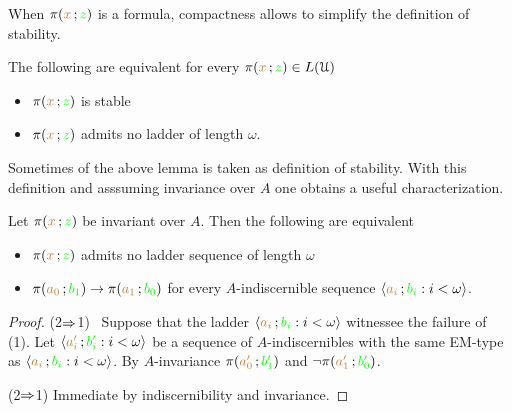 
When $\pi({\color{brown} x}\,;{\color{green} z})$ is a formula, compactness allows to simplify the definition of stability.

\begin{fact}\label{}
  The following are equivalent for every $\pi({\color{brown} x}\,;{\color{green} z})\in L(\EuScript U)$
  \begin{itemize}
    \item [1.] $\pi({\color{brown} x}\,;{\color{green} z})$ is stable
    \item [2.] $\pi({\color{brown} x}\,;{\color{green} z})$ admits no ladder of length $\omega$.
  \end{itemize}
\end{fact}

Sometimes  of the above lemma is taken as definition of stability.
With this definition and asssuming invariance over $A$ one obtains a useful characterization.

\begin{theorem}\label{thm_sability_indiscernibility}
  Let $\pi({\color{brown} x}\,;{\color{green} z})$ be invariant over $A$.
  Then the following are equivalent
  \begin{itemize}
    \item[1.] $\pi({\color{brown} x}\,;{\color{green} z})$ admits no ladder sequence of length $\omega$
    \item[2.] $\pi({\color{brown} a_0}\,;{\color{green} b_1})\rightarrow\pi({\color{brown} a_1}\,;{\color{green} b_0})$ for every $A$-indiscernible sequence $\langle{\color{brown}a_i}\,;{\color{green} b_i} : i<\omega\rangle$.
  \end{itemize}
\end{theorem}

\begin{proof}
  (2$\Rightarrow$1) \ Suppose that the ladder $\langle{\color{brown}a_i}\,;{\color{green} b_i} : i<\omega\rangle$ witnessee the failure of (1).
  Let $\langle{\color{brown}a'_i}\,;{\color{green} b'_i} : i<\omega\rangle$ be a sequence of $A$-indiscernibles with the same EM-type as $\langle{\color{brown}a_i}\,;{\color{green} b_i} : i<\omega\rangle$.
  By $A$-invariance $\pi({\color{brown} a'_0}\,;{\color{green} b'_1})$ and $\neg\pi({\color{brown} a'_1}\,;{\color{green} b'_0})$.

  (2$\Rightarrow$1) Immediate by indiscernibility and invariance.
\end{proof}

